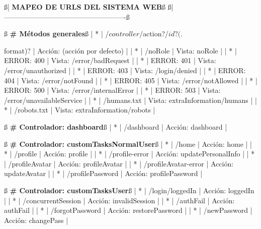 \documentclass[12pt,a4paper, twoside]{report}
\begin{document}
					 
\begin{listing}[style=consola, basicstyle=\ttfamily\scriptsize, numbers=none, escapechar=ß]
ß{\color{ballblue}| \textbf{MAPEO DE URLS DEL SISTEMA WEB}}ß
ß{\color{ballblue}| ----------------------------------------------------}ß

 ß\textbf{{\color{maroon} \# Métodos generales}}ß
 |  *  | /${controller}/${action}?/${id}?(.${format)?    | Acción: (acción por defecto)               |
 |  *  | /noRole                                         | Vista:   noRole                         |
 |  *  | ERROR: 400                                      | Vista:   /error/badRequest              |
 |  *  | ERROR: 401                                      | Vista:   /error/unauthorized            |
 |  *  | ERROR: 403                                      | Vista:   /login/denied                  |
 |  *  | ERROR: 404                                      | Vista:   /error/notFound                |
 |  *  | ERROR: 405                                      | Vista:   /error/notAllowed              |
 |  *  | ERROR: 500                                      | Vista:   /error/internalError           |
 |  *  | ERROR: 503                                      | Vista:   /error/unavailableService      |
 |  *  | /humans.txt                                     | Vista:   extraInformation/humans        |
 |  *  | /robots.txt                                     | Vista:   extraInformation/robots        |

 ß\textbf{{\color{maroon} \# Controlador: dashboard}}ß
 |  *  | /dashboard                                      | Acción: dashboard                      |

 ß\textbf{{\color{maroon} \# Controlador: customTasksNormalUser}}ß
 |  *  | /home                                           | Acción: home                           |
 |  *  | /profile                                        | Acción: profile                        |
 |  *  | /profile-error                                  | Acción: updatePersonalInfo             |
 |  *  | /profileAvatar                                  | Acción: profileAvatar                  |
 |  *  | /profileAvatar-error                            | Acción: updateAvatar                   |
 |  *  | /profilePassword                                | Acción: profilePassword                |

 ß\textbf{{\color{maroon} \# Controlador: customTasksUser}}ß
 |  *  | /login/loggedIn                                 | Acción: loggedIn                       |
 |  *  | /concurrentSession                              | Acción: invalidSession                 |
 |  *  | /authFail                                       | Acción: authFail                       |
 |  *  | /forgotPassword                                 | Acción: restorePassword                |
 |  *  | /newPassword                                    | Acción: changePass                     |
 
}
\end{listing}
\end{document}
